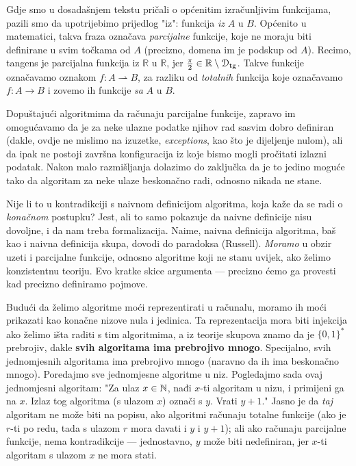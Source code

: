 Gdje smo u dosadašnjem tekstu pričali o općenitim izračunljivim funkcijama, pazili smo da  upotrijebimo prijedlog "iz": funkcija \emph{iz} $A$ u $B$. Općenito u matematici, takva fraza označava \emph{parcijalne} funkcije, koje ne moraju biti definirane u svim točkama od $A$ (precizno, domena im je podskup od $A$). Recimo, tangens je parcijalna funkcija iz $\mathbb R$ u $\mathbb R$, jer $\frac{\pi}{2}\in\mathbb R\setminus \mathcal D_{\text{tg}}$. Takve funkcije označavamo oznakom $f\colon A\rightharpoonup B$, za razliku od \emph{totalnih} funkcija koje označavamo $f\colon A\to B$ i zovemo ih funkcije \emph{sa} $A$ u $B$. 

Dopuštajući algoritmima da računaju parcijalne funkcije, zapravo im omogućavamo da je za neke ulazne podatke njihov rad sasvim dobro definiran (dakle, ovdje ne mislimo na izuzetke, \emph{exceptions}, kao što je dijeljenje nulom), ali da ipak ne postoji završna konfiguracija iz koje bismo mogli pročitati izlazni podatak. Nakon malo razmišljanja dolazimo do zaključka da je to jedino moguće tako da algoritam za neke ulaze beskonačno radi, odnosno nikada ne stane.

Nije li to u kontradikciji s naivnom definicijom algoritma, koja kaže da se radi o \emph{konačnom} postupku? Jest, ali to samo pokazuje da naivne definicije nisu dovoljne, i da nam treba formalizacija. Naime, naivna definicija algoritma, baš kao i naivna definicija skupa, dovodi do paradoksa (Russell). \emph{Moramo} u obzir uzeti i parcijalne funkcije, odnosno algoritme koji ne stanu uvijek, ako želimo konzistentnu teoriju. Evo kratke skice argumenta --- precizno ćemo ga provesti kad precizno definiramo pojmove.

Budući da želimo algoritme moći reprezentirati u računalu, moramo ih moći prikazati kao konačne nizove nula i jedinica. Ta reprezentacija mora biti injekcija ako želimo išta raditi s tim algoritmima, a iz teorije skupova znamo da je $\{0,1\}^*$ prebrojiv, dakle \textbf{svih algoritama ima prebrojivo mnogo}. Specijalno, svih jednomjesnih algoritama  ima prebrojivo mnogo (naravno da ih ima beskonačno mnogo). Poredajmo sve jednomjesne algoritme u niz. Pogledajmo sada ovaj jednomjesni algoritam: "Za ulaz $x\in{\mathbb N}$, nađi $x$-ti algoritam u nizu, i primijeni ga na $x$. Izlaz tog algoritma (s ulazom $x$) označi s $y$. Vrati $y+1$." Jasno je da \emph{taj} algoritam ne može biti na popisu, ako algoritmi računaju totalne funkcije (ako je $r$-ti po redu, tada s ulazom $r$ mora davati i $y$ i $y+1$); ali ako računaju parcijalne funkcije, nema kontradikcije --- jednostavno, $y$ može biti nedefiniran, jer $x$-ti algoritam s ulazom $x$ ne mora stati.

